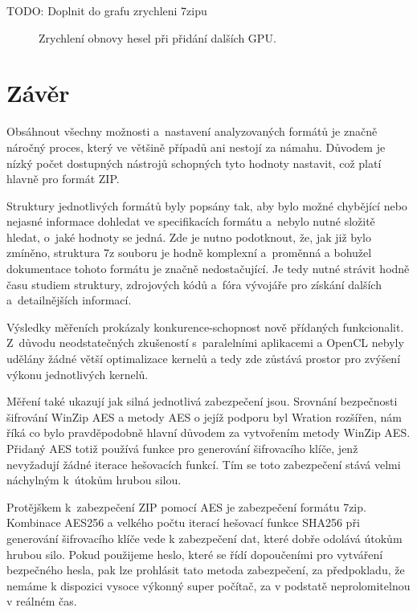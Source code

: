 TODO: Doplnit do grafu zrychleni 7zipu
\begin{center}
    \begin{figure}[ht]
	\caption{Zrychlení obnovy hesel při přidání dalších GPU.}
	\label{memory}
    \end{figure}
\end{center}

\chapter{Závěr}
Obsáhnout všechny možnosti a~nastavení analyzovaných formátů je značně náročný proces, který
ve většině případů ani nestojí za námahu. Důvodem je nízký počet dostupných nástrojů schopných
tyto hodnoty nastavit, což platí hlavně pro formát ZIP.

 Struktury jednotlivých formátů byly popsány tak, aby bylo možné chybějící nebo nejasné informace
dohledat ve specifikacích formátu a~nebylo nutné složitě hledat, o~jaké hodnoty se jedná. Zde
je nutno podotknout, že, jak již bylo zmíněno, struktura 7z souboru je hodně komplexní a~proměnná a
bohužel dokumentace tohoto formátu je značně nedostačující. Je tedy nutné strávit hodně času
studiem struktury, zdrojových kódů a~fóra vývojáře pro získání dalších a~detailnějších informací.

 Výsledky měřeních prokázaly konkurence-schopnost nově přídaných funkcionalit. Z~důvodu
neodstatečných zkušeností s~paralelními aplikacemi a OpenCL nebyly udělány žádné větší
optimalizace kernelů a tedy zde zůstává prostor pro zvýšení výkonu jednotlivých kernelů. 

 Měření také ukazují jak silná jednotlivá zabezpečení jsou. Srovnání bezpečnosti šifrování
WinZip AES a metody AES o jejíž podporu byl Wration rozšířen, nám říká co bylo pravděpodobně hlavní
důvodem za vytvořením metody WinZip AES. Přidaný AES totiž používá funkce pro generování
šifrovacího klíče, jenž nevyžadují žádné iterace hešovacích funkcí. Tím se toto zabezpečení stává
velmi náchylným k~útokům hrubou silou.

Protějškem k~zabezpečení ZIP pomocí AES je zabezpečení formátu 7zip. Kombinace AES256 a velkého
počtu iterací hešovací funkce SHA256 při generování šifrovacího klíče vede k zabezpečení dat, které
dobře odolává útokům hrubou silo. Pokud použijeme heslo, které se řídí dopoučeními pro vytváření
bezpečného hesla, pak lze prohlásit tato metoda zabezpečení, za předpokladu, že nemáme k dispozici
vysoce výkonný super počítač, za v podstatě neprolomitelnou v reálném čas.


